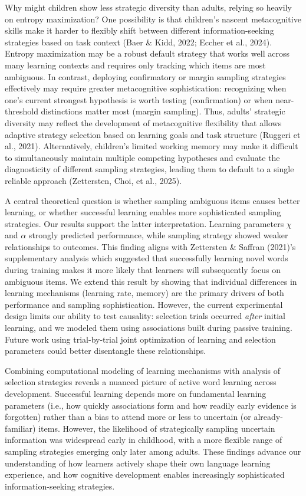 \documentclass[10pt, letterpaper]{article}
\begin{document}
Why might children show less strategic diversity than adults, relying so
heavily on entropy maximization? One possibility is that children's
nascent metacognitive skills make it harder to flexibly shift between
different information-seeking strategies based on task context (Baer \&
Kidd, 2022; Eccher et al., 2024). Entropy maximization may be a robust
default strategy that works well across many learning contexts and
requires only tracking which items are most ambiguous. In contrast,
deploying confirmatory or margin sampling strategies effectively may
require greater metacognitive sophistication: recognizing when one's
current strongest hypothesis is worth testing (confirmation) or when
near-threshold distinctions matter most (margin sampling). Thus, adults'
strategic diversity may reflect the development of metacognitive
flexibility that allows adaptive strategy selection based on learning
goals and task structure (Ruggeri et al., 2021). Alternatively,
children's limited working memory may make it difficult to
simultaneously maintain multiple competing hypotheses and evaluate the
diagnosticity of different sampling strategies, leading them to default
to a single reliable approach (Zettersten, Choi, et al., 2025).

A central theoretical question is whether sampling ambiguous items
causes better learning, or whether successful learning enables more
sophisticated sampling strategies. Our results support the latter
interpretation. Learning parameters \(\chi\) and \(\alpha\) strongly
predicted performance, while sampling strategy showed weaker
relationships to outcomes. This finding aligns with Zettersten \&
Saffran (2021)'s supplementary analysis which suggested that
successfully learning novel words during training makes it more likely
that learners will subsequently focus on ambiguous items. We extend this
result by showing that individual differences in learning mechanisms
(learning rate, memory) are the primary drivers of both performance and
sampling sophistication. However, the current experimental design limits
our ability to test causality: selection trials occurred \emph{after}
initial learning, and we modeled them using associations built during
passive training. Future work using trial-by-trial joint optimization of
learning and selection parameters could better disentangle these
relationships.

Combining computational modeling of learning mechanisms with analysis of
selection strategies reveals a nuanced picture of active word learning
across development. Successful learning depends more on fundamental
learning parameters (i.e., how quickly associations form and how readily
early evidence is forgotten) rather than a bias to attend more or less
to uncertain (or already-familiar) items. However, the likelihood of
strategically sampling uncertain information was widespread early in
childhood, with a more flexible range of sampling strategies emerging
only later among adults. These findings advance our understanding of how
learners actively shape their own language learning experience, and how
cognitive development enables increasingly sophisticated
information-seeking strategies.
\end{document}
